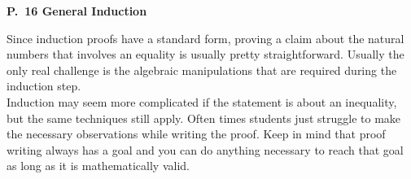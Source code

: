 \documentclass[12 pt]{article}
\theoremstyle{definition}
\theoremstyle{plain}
\theoremstyle{mytheorem}
\theoremstyle{myexample}
\theoremstyle{mydefinition}
\begin{document}
\begin{center}
\textbf{P.~16 General Induction}
\end{center}

\noindent Since induction proofs have a standard form, proving a claim about the natural numbers that involves an equality is usually pretty straightforward.  Usually the only real challenge is the algebraic manipulations that are required during the induction step.\\

Induction may seem more complicated if the statement is about an inequality, but the same techniques still apply.  Often times students just struggle to make the necessary observations while writing the proof.  Keep in mind that proof writing always has a goal and you can do anything necessary to reach that goal as long as it is mathematically valid.

\begin{center}
\end{center}
\end{document}

